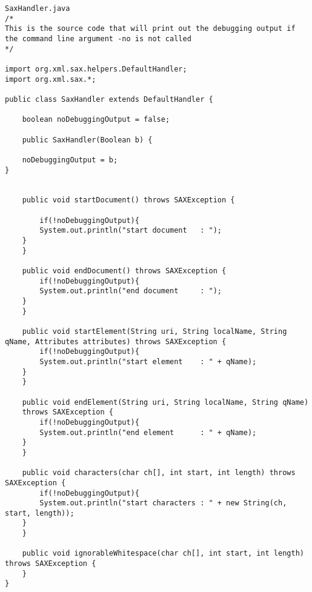 \documentclass[11pt,english]{article}
\begin{document}
\begin{lstlisting}
SaxHandler.java
/*
This is the source code that will print out the debugging output if the command line argument -no is not called
*/

import org.xml.sax.helpers.DefaultHandler;
import org.xml.sax.*;

public class SaxHandler extends DefaultHandler {

	boolean noDebuggingOutput = false;

	public SaxHandler(Boolean b) {
		
	noDebuggingOutput = b;
}


    public void startDocument() throws SAXException {

        if(!noDebuggingOutput){
        System.out.println("start document   : ");
    }
    }

    public void endDocument() throws SAXException {
        if(!noDebuggingOutput){
        System.out.println("end document     : ");
    }
    }

    public void startElement(String uri, String localName, String qName, Attributes attributes) throws SAXException {
        if(!noDebuggingOutput){
        System.out.println("start element    : " + qName);
    }
    }

    public void endElement(String uri, String localName, String qName)
    throws SAXException {
        if(!noDebuggingOutput){
        System.out.println("end element      : " + qName);
    }
    }

    public void characters(char ch[], int start, int length) throws SAXException {
        if(!noDebuggingOutput){
        System.out.println("start characters : " + new String(ch, start, length));
    }
    }

    public void ignorableWhitespace(char ch[], int start, int length) throws SAXException {
    }
}
\end{lstlisting}
\end{document}
